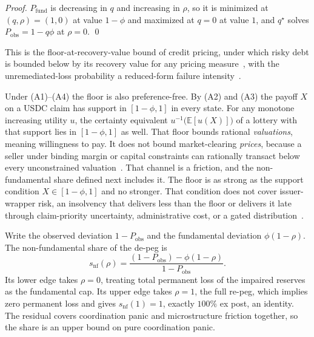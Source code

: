\begin{proof}
$P_{\mathrm{fund}}$ is decreasing in $q$ and increasing in $\rho$, so it is minimized at
$(q,\rho)=(1,0)$ at value $1-\phi$ and maximized at $q=0$ at value $1$, and $q^{\star}$
solves $P_{\mathrm{obs}}=1-q\phi$ at $\rho=0$. \qed
\end{proof}

This is the floor-at-recovery-value bound of credit pricing, under which risky debt is
bounded below by its recovery value for any pricing measure~\cite{merton1974}, with the
unremediated-loss probability a reduced-form failure intensity~\cite{duffiesingleton1999}.

Under (A1)--(A4) the floor is also preference-free. By (A2) and (A3) the payoff $X$ on a
USDC claim has support in $[1-\phi,1]$ in every state. For any monotone increasing utility
$u$, the certainty equivalent $u^{-1}\!\bigl(\mathbb{E}[u(X)]\bigr)$ of a lottery with
that support lies in $[1-\phi,1]$ as well. That floor bounds rational
\emph{valuations}, meaning willingness to pay. It does not bound market-clearing
\emph{prices}, because a seller under binding margin or capital constraints can rationally
transact below every unconstrained valuation~\cite{shleifervishny1997,grombvayanos2010}.
That channel is a friction, and the non-fundamental share defined next includes it. The floor
is as strong as the support condition $X\in[1-\phi,1]$ and no stronger. That condition
does not cover issuer-wrapper risk, an insolvency that delivers less than the floor or
delivers it late through claim-priority uncertainty, administrative cost, or a gated
distribution~\cite{Gorton_2021}.

Write the observed deviation $1-P_{\mathrm{obs}}$ and the fundamental deviation
$\phi(1-\rho)$. The non-fundamental share of the de-peg is
\begin{equation}
s_{\mathrm{nf}}(\rho)
  = \frac{(1-P_{\mathrm{obs}})-\phi(1-\rho)}{1-P_{\mathrm{obs}}} .
\label{eq:share}
\end{equation}
Its lower edge takes $\rho=0$, treating total permanent loss of the impaired reserves as
the fundamental cap. Its upper edge takes $\rho=1$, the full re-peg, which
implies zero permanent loss and gives $s_{\mathrm{nf}}(1)=1$, exactly $100\%$ ex post, an
identity. The residual covers coordination panic and microstructure friction together, so
the share is an upper bound on pure coordination panic.

